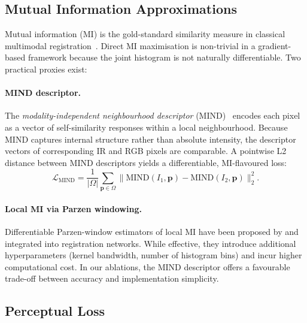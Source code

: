 \subsection{Mutual Information Approximations}
\label{ssec:mi}

Mutual information (MI) is the gold-standard similarity measure in classical
multimodal registration~\cite{maes1997multimodal,viola1997alignment}.  Direct
MI maximisation is non-trivial in a gradient-based framework because the joint
histogram is not naturally differentiable.  Two practical proxies exist:

\paragraph{MIND descriptor.}
The \emph{modality-independent neighbourhood descriptor}
(MIND)~\cite{heinrich2012mind} encodes each pixel as a vector of
self-similarity responses within a local neighbourhood.  Because MIND captures
internal structure rather than absolute intensity, the descriptor vectors of
corresponding IR and RGB pixels are comparable.  A pointwise L2 distance
between MIND descriptors yields a differentiable, MI-flavoured loss:
%
\begin{equation}
  \mathcal{L}_{\text{MIND}}
  = \frac{1}{|\Omega|}\sum_{\mathbf{p}\in\Omega}
    \lVert \text{MIND}(I_{1},\mathbf{p})
         - \text{MIND}(I_{2},\mathbf{p}) \rVert_{2}^{2}.
  \label{eq:mind}
\end{equation}

\paragraph{Local MI via Parzen windowing.}
Differentiable Parzen-window estimators of local MI have been proposed by
\citet{guo2019mutual} and integrated into registration networks.  While
effective, they introduce additional hyperparameters (kernel bandwidth, number
of histogram bins) and incur higher computational cost.  In our ablations, the
MIND descriptor offers a favourable trade-off between accuracy and
implementation simplicity.

\subsection{Perceptual Loss}
\label{ssec:perceptual}

